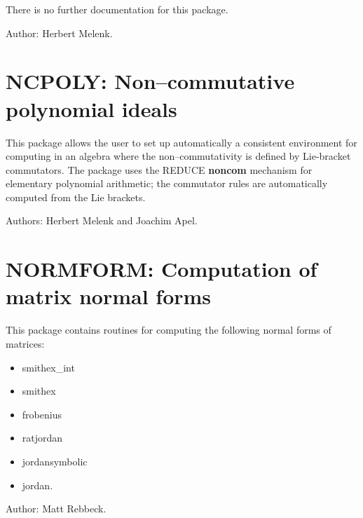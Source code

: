 There is no further documentation for this package.

Author: Herbert Melenk.

\section{NCPOLY: Non--commutative polynomial ideals}

This package allows the user to set up automatically a consistent
environment for computing in an algebra where the non--commutativity is
defined by Lie-bracket commutators.  The package uses the {REDUCE} {\bf
noncom} mechanism for elementary polynomial arithmetic; the commutator
rules are automatically computed from the Lie brackets.

Authors: Herbert Melenk and Joachim Apel.

\section{NORMFORM: Computation of matrix normal forms} 
\label{NORMFORM}

This package contains routines for computing the following
normal forms of matrices:
\begin{itemize}
\item smithex\_int
\item smithex
\item frobenius
\item ratjordan
\item jordansymbolic
\item jordan.
\end{itemize}

Author: Matt Rebbeck.

